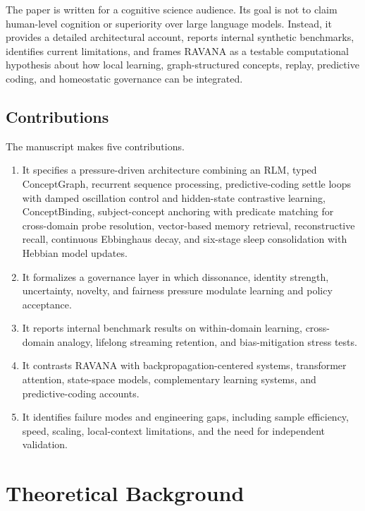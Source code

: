 \documentclass[11pt]{article}
\begin{document}
The paper is written for a cognitive science audience. Its goal is not to claim human-level cognition or superiority over large language models. Instead, it provides a detailed architectural account, reports internal synthetic benchmarks, identifies current limitations, and frames RAVANA as a testable computational hypothesis about how local learning, graph-structured concepts, replay, predictive coding, and homeostatic governance can be integrated.

\subsection{Contributions}
The manuscript makes five contributions.
\begin{enumerate}[leftmargin=*]
    \item It specifies a pressure-driven architecture combining an RLM, typed ConceptGraph, recurrent sequence processing, predictive-coding settle loops with damped oscillation control and hidden-state contrastive learning, ConceptBinding, subject-concept anchoring with predicate matching for cross-domain probe resolution, vector-based memory retrieval, reconstructive recall, continuous Ebbinghaus decay, and six-stage sleep consolidation with Hebbian model updates.
    \item It formalizes a governance layer in which dissonance, identity strength, uncertainty, novelty, and fairness pressure modulate learning and policy acceptance.
    \item It reports internal benchmark results on within-domain learning, cross-domain analogy, lifelong streaming retention, and bias-mitigation stress tests.
    \item It contrasts RAVANA with backpropagation-centered systems, transformer attention, state-space models, complementary learning systems, and predictive-coding accounts.
    \item It identifies failure modes and engineering gaps, including sample efficiency, speed, scaling, local-context limitations, and the need for independent validation.
\end{enumerate}

\section{Theoretical Background}
\end{document}
